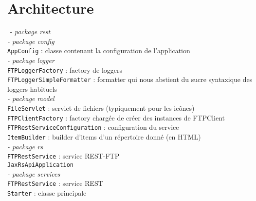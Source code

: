 \section*{Architecture}
\begin{tabbing}
	\hspace{1cm}\=\hspace{1cm}\=\kill
	\textit{- package rest}\\
		\>\textit{- package config}\\
			\>\>\verb+AppConfig+ : classe contenant la configuration de l'application\\
		\>\textit{- package logger}\\
			\>\>\verb+FTPLoggerFactory+ : factory de loggers\\
			\>\>\verb+FTPLoggerSimpleFormatter+ : formatter qui nous abstient du sucre syntaxique des \\\>\>loggers habituels \\
		\>\textit{- package model}\\
			\>\>\verb+FileServlet+ : servlet de fichiers (typiquement pour les icônes)\\
			\>\>\verb+FTPClientFactory+ : factory chargée de créer des instances de FTPClient\\
			\>\>\verb+FTPRestServiceConfiguration+ : configuration du service\\
			\>\>\verb+ItemBuilder+ : builder d'items d'un répertoire donné (en HTML)\\
		\>\textit{- package rs}\\
			\>\>\verb+FTPRestService+ : service REST-FTP\\
			\>\>\verb+JaxRsApiApplication+\\
		\>\textit{- package services}\\
			\>\>\verb+FTPRestService+ : service REST\\	
	\>\verb+Starter+ : classe principale
\end{tabbing}
